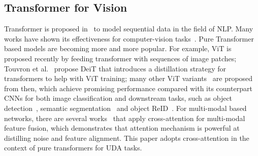\documentclass[dvipsnames, svgnames, x11names, table]{article} \usepackage{iclr2022_conference,times}
\begin{document}
\begin{spacing}{1.0}
\subsection{Transformer for Vision}
Transformer is proposed in~\citep{vaswani2017attention} to model sequential data in the field of NLP. Many works have shown its effectiveness for computer-vision tasks~\citep{han2020survey,khan2021transformers,li2021transformer,han2021context,yu2021transrppg,li2021lifting,yang2021transformer,qian2022entroformer}. Pure Transformer based models are becoming more and more popular. For example, ViT \citep{dosovitskiy2020image} is proposed recently  by feeding transformer with sequences of image patches; Touvron et al.~\citep{touvron2021training} propose DeiT that introduces a distillation strategy for transformers to help with ViT training; many other ViT variants~
\citep{yuan2021tokens,wang2021pyramid,han2021transformer,chen2021psvit,ranftl2021vision,liu2021swin} 
are proposed from then, which achieve promising performance compared with its counterpart CNNs for both image classification and downstream tasks, such as object detection~\citep{liu2021swin}, semantic segmentation~\citep{yuan2021volo} and object ReID~\citep{he2021transreid}. For multi-modal based networks, there are several works~\citep{tsai2019multimodal,li2021trear,hu2021unit} that apply cross-attention for multi-modal feature fusion, which demonstrates that attention mechanism is powerful at distilling noise and feature alignment. This paper adopts cross-attention in the context of pure transformers for UDA tasks.
 


\end{spacing}
\end{document}
